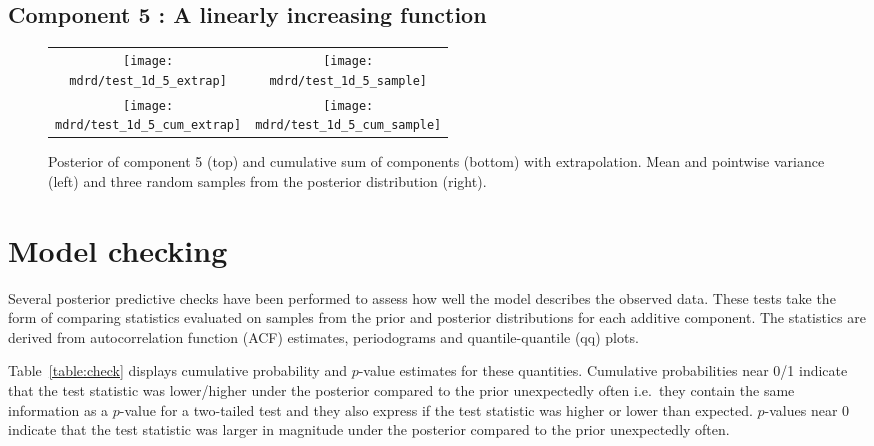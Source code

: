 \documentclass{article} %
\def\ie{i.e.\ }
\begin{document}
\subsection{Component 5 : A linearly increasing function}



\begin{figure}[H]
\newcommand{\wmgd}{0.5\columnwidth}
\newcommand{\hmgd}{3.0cm}
\newcommand{\mdrd}{test_1d}
\newcommand{\mbm}{\hspace{-0.3cm}}
\begin{tabular}{cc}
\mbm \texttt{[image: \\mdrd/test\_1d\_5\_extrap]} & \texttt{[image: \\mdrd/test\_1d\_5\_sample]} \\
\mbm \texttt{[image: \\mdrd/test\_1d\_5\_cum\_extrap]} & \texttt{[image: \\mdrd/test\_1d\_5\_cum\_sample]}
\end{tabular}
\caption{Posterior of component 5 (top) and cumulative sum of components (bottom) with extrapolation. Mean and pointwise variance (left) and three random samples from the posterior distribution (right).}
\label{fig:extrap5}
\end{figure}

\section{Model checking}
\label{sec:check}

Several posterior predictive checks have been performed to assess how well the model describes the observed data.
These tests take the form of comparing statistics evaluated on samples from the prior and posterior distributions for each additive component.
The statistics are derived from autocorrelation function (ACF) estimates, periodograms and quantile-quantile (qq) plots.

Table~\ref{table:check} displays cumulative probability and $p$-value estimates for these quantities.
Cumulative probabilities near 0/1 indicate that the test statistic was lower/higher under the posterior compared to the prior unexpectedly often \ie they contain the same information as a $p$-value for a two-tailed test and they also express if the test statistic was higher or lower than expected.
$p$-values near 0 indicate that the test statistic was larger in magnitude under the posterior compared to the prior unexpectedly often.
\end{document}
